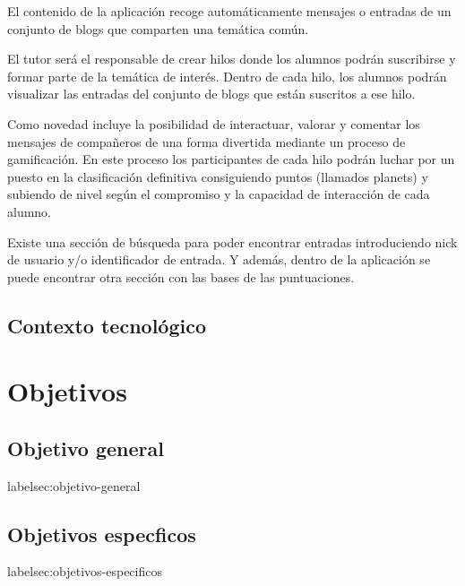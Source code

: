 \documentclass[a4paper, 12pt]{book}
\begin{document}
El contenido de la aplicaci\'on recoge autom\'aticamente mensajes o entradas de un conjunto de blogs que comparten una tem\'atica com\'un.

El tutor ser\'a el responsable de crear hilos donde los alumnos podr\'an suscribirse y formar parte de la tem\'atica de inter\'es. Dentro de cada hilo,
los alumnos podr\'an visualizar las entradas del conjunto de blogs que est\'an suscritos a ese hilo.

Como novedad incluye la posibilidad de interactuar, valorar y comentar los mensajes de compa\~neros de una forma divertida mediante un proceso de 
gamificaci\'on. En este proceso los participantes de cada hilo podr\'an luchar por un puesto en la clasificaci\'on definitiva consiguiendo 
puntos (llamados planets) y subiendo de nivel seg\'un el compromiso y la capacidad de interacci\'on de cada alumno.

Existe una secci\'on de b\'usqueda para poder encontrar entradas introduciendo nick de usuario y/o identificador de entrada. Y adem\'as, dentro de la
aplicaci\'on se puede encontrar otra secci\'on con las bases de las puntuaciones.

\section{Contexto tecnol\'ogico}
\label{sec:contexto}









\cleardoublepage
\chapter{Objetivos}
\label{chap:objetivos}

\section{Objetivo general}
label{sec:objetivo-general}


\section{Objetivos especficos}
label{sec:objetivos-especificos}
\end{document}
